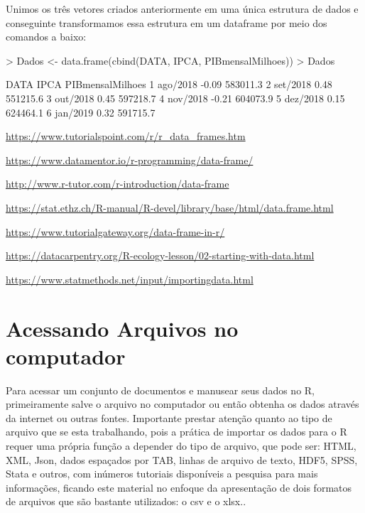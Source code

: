 \documentclass[12pt,a4paper,oneside]{erdc}
\begin{document}
\newpage

Unimos os três vetores criados anteriormente em uma única estrutura de dados e conseguinte transformamos essa estrutura em um dataframe por meio dos comandos a baixo:
\begin{Schunk}
\begin{Sinput}
> Dados <- data.frame(cbind(DATA, IPCA, PIBmensalMilhoes))
> Dados
\end{Sinput}
\begin{Soutput}
      DATA  IPCA PIBmensalMilhoes
1 ago/2018 -0.09         583011.3
2 set/2018  0.48         551215.6
3 out/2018  0.45         597218.7
4 nov/2018 -0.21         604073.9
5 dez/2018  0.15         624464.1
6 jan/2019  0.32         591715.7
\end{Soutput}
\end{Schunk}



\url{https://www.tutorialspoint.com/r/r_data_frames.htm}

\url{https://www.datamentor.io/r-programming/data-frame/}

\url{http://www.r-tutor.com/r-introduction/data-frame}

\url{https://stat.ethz.ch/R-manual/R-devel/library/base/html/data.frame.html}

\url{https://www.tutorialgateway.org/data-frame-in-r/}

\url{https://datacarpentry.org/R-ecology-lesson/02-starting-with-data.html}

\url{https://www.statmethods.net/input/importingdata.html}

\section{Acessando Arquivos no computador}

Para acessar um conjunto de documentos e manusear seus dados no R, primeiramente salve o arquivo no computador ou então obtenha os dados através da internet ou outras fontes. Importante prestar atenção quanto ao tipo de arquivo que se esta trabalhando, pois a prática de importar os dados para o R requer uma própria função a depender do tipo de arquivo, que pode ser: HTML, XML, Json, dados espaçados por TAB, linhas de arquivo de texto, HDF5, SPSS, Stata e outros, com inúmeros tutoriais disponíveis a pesquisa para mais informações, ficando este material no enfoque da apresentação de dois formatos de arquivos que são bastante utilizados: o csv e o xlsx..
\end{document}
